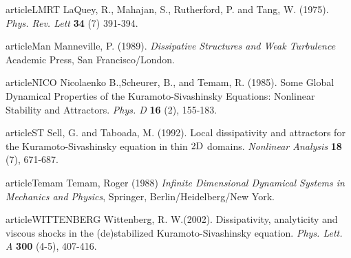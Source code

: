 article{LMRT} LaQuey, R., Mahajan, S., Rutherford, P. and Tang, W. (1975).
{\it Phys. Rev. Lett} {\bf 34} (7) 391-394.


article{Man} Manneville, P. (1989).
{\it Dissipative Structures and Weak Turbulence} Academic Press, San Francisco/London.

article{NICO}
Nicolaenko B.,Scheurer, B., and Temam, R. (1985).
Some Global Dynamical Properties of the Kuramoto-Sivashinsky Equations: Nonlinear Stability and Attractors.
{\it Phys. D}
{\bf 16} (2), 155-183.

article{ST} Sell, G. and Taboada, M. (1992).
 Local dissipativity and attractors for the Kuramoto-Sivashinsky
equation in thin $2{\rm D}$ domains.
{\it Nonlinear Analysis} {\bf 18} (7), 671-687.

article{Temam}
Temam, Roger (1988)
{\itshape Infinite Dimensional Dynamical Systems in Mechanics and Physics},
Springer, Berlin/Heidelberg/New York.

article{WITTENBERG}
Wittenberg, R. W.(2002).
Dissipativity, analyticity and viscous shocks in the (de)stabilized
Kuramoto-Sivashinsky equation.
{\it Phys. Lett. A}
{\bf 300} (4-5), 407-416.
